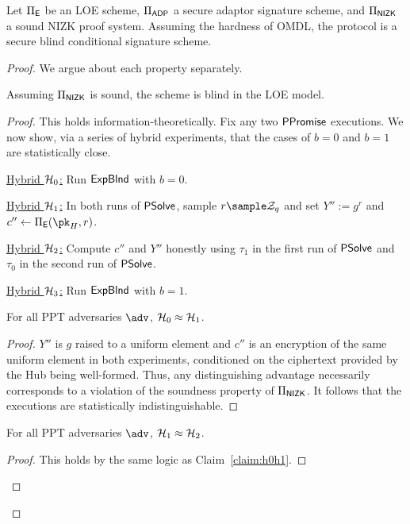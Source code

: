 \begin{theorem}\label{thm:a2l}
    Let $\Pi_{\mathsf{E}}$ be an LOE scheme, $\Pi_{\mathsf{ADP}}$ a secure adaptor signature scheme, and $\Pi_{\mathsf{NIZK}}$ a sound NIZK proof system. Assuming the hardness of OMDL, the \aalplus protocol is a secure blind conditional signature scheme.
\end{theorem}
\begin{proof}
    We argue about each property separately.
    \begin{lemma}[Blindness]\label{lem:blindness}
    Assuming $\Pi_{\mathsf{NIZK}}$ is sound, the \aalplus scheme is blind in the LOE model.
    \end{lemma}

    \begin{proof}
        This holds information-theoretically. Fix any two $\mathsf{PPromise}$ executions. We now show, via a series of hybrid experiments, that the cases of $b=0$ and $b=1$ are statistically close.
        
        \smallskip
        \noindent\underline{Hybrid $\mathcal{H}_0$:} Run $\mathsf{ExpBlnd}$ with $b=0$.
        
        \smallskip
        \noindent\underline{Hybrid $\mathcal{H}_1$:} In both runs of $\mathsf{PSolve}$, sample $r \sample \Z_q$ and set $Y'' := g^r$ and $c'' \gets \Pi_\ENC(\pk_H,r)$.
        
        \smallskip
        \noindent\underline{Hybrid $\mathcal{H}_2$:} Compute $c''$ and $Y''$ honestly using $\tau_1$ in the first run of $\mathsf{PSolve}$ and $\tau_0$ in the second run of $\mathsf{PSolve}$.
        
        \smallskip
        \noindent\underline{Hybrid $\mathcal{H}_3$:} Run $\mathsf{ExpBlnd}$ with $b=1$.
        
        \begin{claim}\label{claim:h0h1}
        For all PPT adversaries $\adv$, $\mathcal{H}_0 \approx \mathcal{H}_1$.
        \end{claim}
        \begin{proof}
        $Y''$ is $g$ raised to a uniform element and $c''$ is an encryption of the same uniform element in both experiments, conditioned on the ciphertext provided by the Hub being well-formed. Thus, any distinguishing advantage necessarily corresponds to a violation of the soundness property of $\Pi_{\mathsf{NIZK}}$. It follows that the executions are statistically indistinguishable.
        \end{proof}
        
        \begin{claim}\label{claim:h1h2}
        For all PPT adversaries $\adv$, $\mathcal{H}_1 \approx \mathcal{H}_2$.
        \end{claim}
        \begin{proof}
        This holds by the same logic as Claim~\ref{claim:h0h1}.
        \end{proof}
        

\end{proof}
\end{proof}
